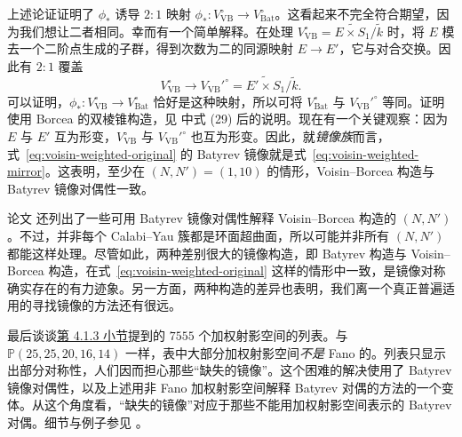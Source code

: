 上述论证证明了 $\phi_*$ 诱导 $2:1$ 映射 $\phi_*:V_{\mathrm{VB}}^\circ\to V_{\mathrm{Bat}}^\circ$。这看起来不完全符合期望，因为我们想让二者相同。幸而有一个简单解释。在处理 $V_{\mathrm{VB}}^\circ=\widetilde{E\times S_1}/\widetilde k$ 时，将 $E$ 模去一个二阶点生成的子群，得到次数为二的同源映射 $E\to E'$，它与对合交换。因此有 $2:1$ 覆盖
\[
V_{\mathrm{VB}}^\circ\longrightarrow V_{\mathrm{VB}}'^\circ
=\widetilde{E'\times S_1}/\widetilde k.
\]
可以证明，$\phi_*:V_{\mathrm{VB}}^\circ\to V_{\mathrm{Bat}}^\circ$ 恰好是这种映射，所以可将 $V_{\mathrm{Bat}}^\circ$ 与 $V_{\mathrm{VB}}'^\circ$ 等同。证明使用 Borcea 的双棱锥构造，见  中式 (29) 后的说明。现在有一个关键观察：因为 $E$ 与 $E'$ 互为形变，$V_{\mathrm{VB}}^\circ$ 与 $V_{\mathrm{VB}}'^\circ$ 也互为形变。因此，就\emph{镜像族}而言，式~\eqref{eq:voisin-weighted-original} 的 Batyrev 镜像就是式~\eqref{eq:voisin-weighted-mirror}。这表明，至少在 $(N,N')=(1,10)$ 的情形，Voisin--Borcea 构造与 Batyrev 镜像对偶性一致。

论文  还列出了一些可用 Batyrev 镜像对偶性解释 Voisin--Borcea 构造的 $(N,N')$。不过，并非每个 Calabi--Yau 簇都是环面超曲面，所以可能并非所有 $(N,N')$ 都能这样处理。尽管如此，两种差别很大的镜像构造，即 Batyrev 构造与 Voisin--Borcea 构造，在式~\eqref{eq:voisin-weighted-original} 这样的情形中一致，是镜像对称确实存在的有力迹象。另一方面，两种构造的差异也表明，我们离一个真正普遍适用的寻找镜像的方法还有很远。

最后谈谈\hyperref[subsec:batyrev-hodge]{第 4.1.3 小节}提到的 $7555$ 个加权射影空间的列表。与 $\mathbb P(25,25,20,16,14)$ 一样，表中大部分加权射影空间\emph{不是} Fano 的。列表只显示出部分对称性，人们因而担心那些“缺失的镜像”。这个困难的解决使用了 Batyrev 镜像对偶性，以及上述用非 Fano 加权射影空间解释 Batyrev 对偶的方法的一个变体。从这个角度看，“缺失的镜像”对应于那些不能用加权射影空间表示的 Batyrev 对偶。细节与例子参见 。

